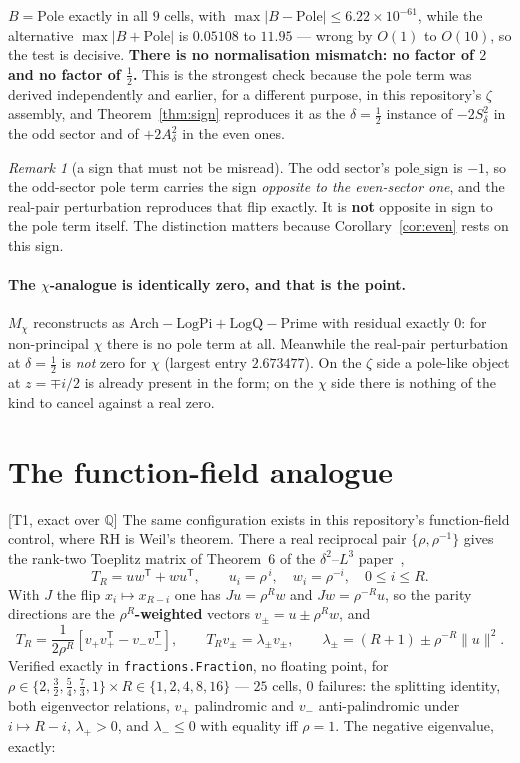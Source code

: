 \documentclass[11pt,a4paper]{article}
\theoremstyle{remark}
\newtheorem{remark}[theorem]{Remark}
\newcommand{\tier}[1]{{\small\textsf{[#1]}}}
\newcommand{\Ad}{A_\delta}
\newcommand{\Sd}{S_\delta}
\begin{document}


\noindent $B=\mathrm{Pole}$ exactly in all $9$ cells, with
$\max|B-\mathrm{Pole}|\le6.22\times10^{-61}$, while the alternative $\max|B+\mathrm{Pole}|$
is $0.05108$ to $11.95$ --- wrong by $O(1)$ to $O(10)$, so the test is decisive.
\textbf{There is no normalisation mismatch: no factor of $2$ and no factor of
$\tfrac12$.} This is the strongest check because the pole term was derived independently and
earlier, for a different purpose, in this repository's $\zeta$ assembly,
and Theorem~\ref{thm:sign} reproduces it as the $\delta=\tfrac12$ instance of $-2\Sd^2$ in
the odd sector and of $+2\Ad^2$ in the even ones.

\begin{remark}[a sign that must not be misread]
The odd sector's $\mathrm{pole\_sign}$ is $-1$, so the odd-sector pole term carries the
sign \emph{opposite to the even-sector one}, and the real-pair perturbation reproduces that
flip exactly. It is \textbf{not} opposite in sign to the pole term itself. The distinction
matters because Corollary~\ref{cor:even} rests on this sign.
\end{remark}

\paragraph{The $\chi$-analogue is identically zero, and that is the point.} $M_\chi$
reconstructs as $\mathrm{Arch}-\mathrm{LogPi}+\mathrm{LogQ}-\mathrm{Prime}$ with residual
exactly $0$: for non-principal $\chi$ there is no pole term at all. Meanwhile the real-pair
perturbation at $\delta=\tfrac12$ is \emph{not} zero for $\chi$ (largest entry
$2.673477$).
On the $\zeta$ side a pole-like object at $z=\mp i/2$ is already present in the form; on the
$\chi$ side there is nothing of the kind to cancel against a real zero.

\section{The function-field analogue}\label{sec:ff}

\tier{T1, exact over $\mathbb{Q}$} The same configuration exists in this repository's
function-field control, where RH is Weil's theorem. There a real reciprocal pair
$\{\rho,\rho^{-1}\}$ gives the rank-two Toeplitz matrix of Theorem~6 of the $\delta^2$--$L^3$
paper~\cite{deltaL3},
\[
T_R=u w^{\mathsf T}+w u^{\mathsf T},\qquad u_i=\rho^{\,i},\quad w_i=\rho^{-i},\quad 0\le i\le R .
\]
With $J$ the flip $x_i\mapsto x_{R-i}$ one has $Ju=\rho^Rw$ and $Jw=\rho^{-R}u$, so the
parity directions are the \textbf{$\rho^R$-weighted} vectors $v_\pm=u\pm\rho^Rw$, and
\[
T_R=\frac{1}{2\rho^R}\left[v_+v_+^{\mathsf T}-v_-v_-^{\mathsf T}\right],
\qquad T_Rv_\pm=\lambda_\pm v_\pm,
\qquad \lambda_\pm=(R+1)\pm\rho^{-R}\|u\|^2 .
\]
Verified exactly in \texttt{fractions.Fraction}, no floating point, for
$\rho\in\{2,\tfrac32,\tfrac54,\tfrac73,1\}\times R\in\{1,2,4,8,16\}$ --- $25$ cells, $0$
failures: the splitting identity, both eigenvector relations, $v_+$ palindromic and $v_-$
anti-palindromic under $i\mapsto R-i$, $\lambda_+>0$, and $\lambda_-\le0$ with equality iff
$\rho=1$. The negative eigenvalue, exactly:
\end{document}
